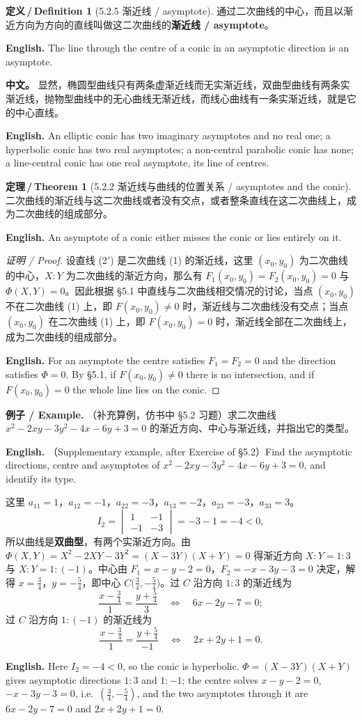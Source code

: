 \documentclass[UTF8,11pt,a4paper]{ctexart}
\newcommand{\APS}[2]{\par\noindent\textbf{中文。} #1\par\noindent\textbf{English.} #2\par\smallskip}
\newcommand{\EN}[1]{\par\noindent \textbf{English.} #1\par}
\newcommand{\EX}[2]{\par\noindent \textbf{例子 / Example.} #1\par\EN{#2}}
\theoremstyle{definition}
\newtheorem*{definition}{定义\,/\,Definition}
\newtheorem*{theorem}{定理\,/\,Theorem}
\begin{document}
\begin{definition}[5.2.5 渐近线 / asymptote]\label{def:asymptote}
通过二次曲线的中心，而且以渐近方向为方向的直线叫做这二次曲线的\textbf{渐近线 / asymptote}。
\EN{The line through the centre of a conic in an asymptotic direction is an asymptote.}
\end{definition}

\APS{显然，椭圆型曲线只有两条虚渐近线而无实渐近线，双曲型曲线有两条实渐近线，抛物型曲线中的无心曲线无渐近线，而线心曲线有一条实渐近线，就是它的中心直线。}{An elliptic conic has two imaginary asymptotes and no real one; a hyperbolic conic has two real asymptotes; a non-central parabolic conic has none; a line-central conic has one real asymptote, its line of centres.}

\begin{theorem}[5.2.2 渐近线与曲线的位置关系 / asymptotes and the conic]\label{thm:asymptote}
二次曲线的渐近线与这二次曲线或者没有交点，或者整条直线在这二次曲线上，成为二次曲线的组成部分。
\EN{An asymptote of a conic either misses the conic or lies entirely on it.}
\end{theorem}

\begin{proof}[证明 / Proof]
设直线 (2$'$) 是二次曲线 (1) 的渐近线，这里 $(x_0,y_0)$ 为二次曲线的中心，$X:Y$ 为二次曲线的渐近方向，那么有 $F_1(x_0,y_0)=F_2(x_0,y_0)=0$ 与 $\Phi(X,Y)=0$。因此根据 §5.1 中直线与二次曲线相交情况的讨论，当点 $(x_0,y_0)$ 不在二次曲线 (1) 上，即 $F(x_0,y_0)\ne0$ 时，渐近线与二次曲线没有交点；当点 $(x_0,y_0)$ 在二次曲线 (1) 上，即 $F(x_0,y_0)=0$ 时，渐近线全部在二次曲线上，成为二次曲线的组成部分。
\EN{For an asymptote the centre satisfies $F_1=F_2=0$ and the direction satisfies $\Phi=0$. By §5.1, if $F(x_0,y_0)\ne0$ there is no intersection, and if $F(x_0,y_0)=0$ the whole line lies on the conic.}
\end{proof}

\EX{（补充算例，仿书中 §5.2 习题）求二次曲线 $x^2-2xy-3y^2-4x-6y+3=0$ 的渐近方向、中心与渐近线，并指出它的类型。}{（Supplementary example, after Exercise of §5.2）Find the asymptotic directions, centre and asymptotes of $x^2-2xy-3y^2-4x-6y+3=0$, and identify its type.}
这里 $a_{11}=1$，$a_{12}=-1$，$a_{22}=-3$，$a_{13}=-2$，$a_{23}=-3$，$a_{33}=3$。
\[
I_2=\begin{vmatrix}1&-1\\ -1&-3\end{vmatrix}=-3-1=-4<0,
\]
所以曲线是\textbf{双曲型}，有两个实渐近方向。由 $\Phi(X,Y)=X^2-2XY-3Y^2=(X-3Y)(X+Y)=0$ 得渐近方向 $X:Y=1:3$ 与 $X:Y=1:(-1)$。中心由 $F_1=x-y-2=0$，$F_2=-x-3y-3=0$ 决定，解得 $x=\frac34$，$y=-\frac54$，即中心 $C\bigl(\frac34,-\frac54\bigr)$。过 $C$ 沿方向 $1:3$ 的渐近线为
\[
\frac{x-\frac34}{1}=\frac{y+\frac54}{3}\quad\Longleftrightarrow\quad 6x-2y-7=0;
\]
过 $C$ 沿方向 $1:(-1)$ 的渐近线为
\[
\frac{x-\frac34}{1}=\frac{y+\frac54}{-1}\quad\Longleftrightarrow\quad 2x+2y+1=0.
\]
\EN{Here $I_2=-4<0$, so the conic is hyperbolic. $\Phi=(X-3Y)(X+Y)$ gives asymptotic directions $1:3$ and $1:-1$; the centre solves $x-y-2=0$, $-x-3y-3=0$, i.e.\ $(\tfrac34,-\tfrac54)$, and the two asymptotes through it are $6x-2y-7=0$ and $2x+2y+1=0$.}
\end{document}
